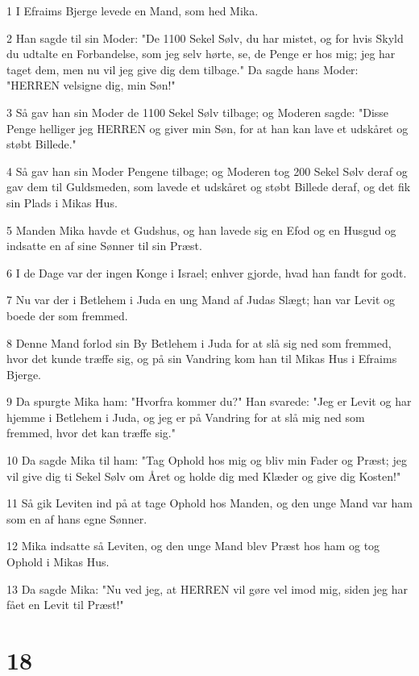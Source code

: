 \par 1 I Efraims Bjerge levede en Mand, som hed Mika.
\par 2 Han sagde til sin Moder: "De 1100 Sekel Sølv, du har mistet, og for hvis Skyld du udtalte en Forbandelse, som jeg selv hørte, se, de Penge er hos mig; jeg har taget dem, men nu vil jeg give dig dem tilbage." Da sagde hans Moder: "HERREN velsigne dig, min Søn!"
\par 3 Så gav han sin Moder de 1100 Sekel Sølv tilbage; og Moderen sagde: "Disse Penge helliger jeg HERREN og giver min Søn, for at han kan lave et udskåret og støbt Billede."
\par 4 Så gav han sin Moder Pengene tilbage; og Moderen tog 200 Sekel Sølv deraf og gav dem til Guldsmeden, som lavede et udskåret og støbt Billede deraf, og det fik sin Plads i Mikas Hus.
\par 5 Manden Mika havde et Gudshus, og han lavede sig en Efod og en Husgud og indsatte en af sine Sønner til sin Præst.
\par 6 I de Dage var der ingen Konge i Israel; enhver gjorde, hvad han fandt for godt.
\par 7 Nu var der i Betlehem i Juda en ung Mand af Judas Slægt; han var Levit og boede der som fremmed.
\par 8 Denne Mand forlod sin By Betlehem i Juda for at slå sig ned som fremmed, hvor det kunde træffe sig, og på sin Vandring kom han til Mikas Hus i Efraims Bjerge.
\par 9 Da spurgte Mika ham: "Hvorfra kommer du?" Han svarede: "Jeg er Levit og har hjemme i Betlehem i Juda, og jeg er på Vandring for at slå mig ned som fremmed, hvor det kan træffe sig."
\par 10 Da sagde Mika til ham: "Tag Ophold hos mig og bliv min Fader og Præst; jeg vil give dig ti Sekel Sølv om Året og holde dig med Klæder og give dig Kosten!"
\par 11 Så gik Leviten ind på at tage Ophold hos Manden, og den unge Mand var ham som en af hans egne Sønner.
\par 12 Mika indsatte så Leviten, og den unge Mand blev Præst hos ham og tog Ophold i Mikas Hus.
\par 13 Da sagde Mika: "Nu ved jeg, at HERREN vil gøre vel imod mig, siden jeg har fået en Levit til Præst!"

\chapter{18}

